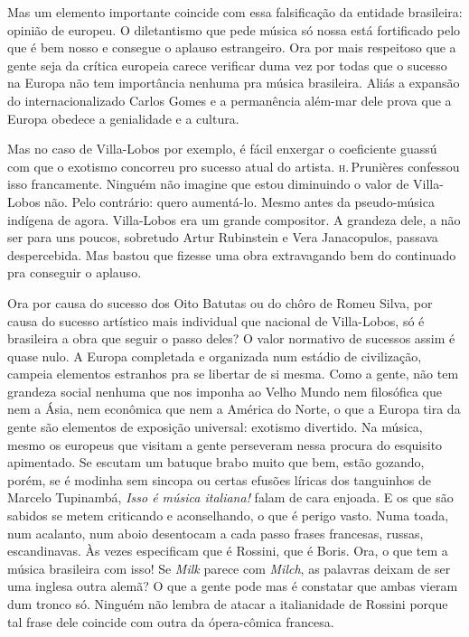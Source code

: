 Mas um elemento importante coincide com essa falsificação da entidade
brasileira: opinião de europeu. O diletantismo que pede música só nossa
está fortificado pelo que é bem nosso e consegue o aplauso
estrangeiro. Ora por mais respeitoso que a gente seja da crítica
europeia carece verificar duma vez por todas que o sucesso na Europa não
tem importância nenhuma pra música brasileira. Aliás a expansão do
internacionalizado Carlos Gomes e a permanência além-mar dele prova que
a Europa obedece a genialidade e a cultura.

Mas no caso de Villa-Lobos por exemplo, é fácil enxergar o coeficiente
guassú com que o exotismo concorreu pro sucesso atual do artista. \textsc{h}.\,Prunières confessou isso francamente. Ninguém não imagine que estou
diminuindo o valor de Villa-Lobos não. Pelo contrário: quero aumentá-lo.
Mesmo antes da pseudo-música indígena de agora. Villa-Lobos era um
grande compositor. A grandeza dele, a não ser para uns poucos, sobretudo
Artur Rubinstein e Vera Janacopulos, passava despercebida. Mas bastou
que fizesse uma obra extravagando bem do continuado pra conseguir o
aplauso.

Ora por causa do sucesso dos Oito Batutas ou do chôro de Romeu Silva,
por causa do sucesso artístico mais individual que nacional de
Villa-Lobos, só é brasileira a obra que seguir o passo deles? O valor
normativo de sucessos assim é quase nulo. A Europa completada e
organizada num estádio de civilização, campeia elementos estranhos pra
se libertar de si mesma. Como a gente, não tem grandeza social nenhuma
que nos imponha ao Velho Mundo nem filosófica que nem a Ásia, nem
econômica que nem a América do Norte, o que a Europa tira da gente são
elementos de exposição universal: exotismo divertido. Na música, mesmo
os europeus que visitam a gente perseveram nessa procura do esquisito
apimentado. Se escutam um batuque brabo muito que bem, estão gozando,
porém, se é modinha sem sincopa ou certas efusões líricas dos tanguinhos
de Marcelo Tupinambá, \textit{Isso é música italiana!} falam de cara
enjoada. E os que são sabidos se metem criticando e aconselhando, o que
é perigo vasto. Numa toada, num acalanto, num aboio desentocam a cada
passo frases francesas, russas, escandinavas. Às vezes especificam que é
Rossini, que é Boris. Ora, o que tem a música brasileira com isso!
Se \textit{Milk} parece com \textit{Milch}, as palavras deixam de ser uma
inglesa outra alemã? O que a gente pode mas é constatar que ambas vieram
dum tronco só. Ninguém não lembra de atacar a italianidade de Rossini
porque tal frase dele coincide com outra da ópera-cômica francesa.

